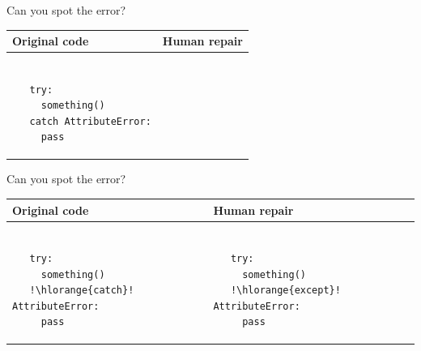 \documentclass{beamer}
\begin{document}
\begin{frame}[fragile]{Can you spot the error?}
  \begin{center}
    \begin{tabular}{|m{5.5cm}|m{5.5cm}|}
      \hline \rule{0pt}{2.5ex}\textbf{Original code}\rule[-1ex]{0pt}{2ex} &  \rule{0pt}{2.5ex}\textbf{Human repair}\rule[-1ex]{0pt}{2ex} \\\hline
      \begin{lstlisting}[escapechar=!, basicstyle=\linespread{1.3}\ttfamily\footnotesize]

   try:
     something()
   catch AttributeError:
     pass

      \end{lstlisting} & \begin{lstlisting}[escapechar=!, basicstyle=\linespread{1.3}\ttfamily\footnotesize]

      \end{lstlisting} \\\hline
    \end{tabular}
  \end{center}
\end{frame}

\begin{frame}[fragile]{Can you spot the error?}
  \begin{center}
    \begin{tabular}{|m{5.5cm}|m{5.5cm}|}
      \hline \rule{0pt}{2.5ex}\textbf{Original code}\rule[-1ex]{0pt}{2ex} &  \rule{0pt}{2.5ex}\textbf{Human repair}\rule[-1ex]{0pt}{2ex} \\\hline
      \begin{lstlisting}[escapechar=!, basicstyle=\linespread{1.3}\ttfamily\footnotesize]

   try:
     something()
   !\hlorange{catch}! AttributeError:
     pass

      \end{lstlisting} & \begin{lstlisting}[escapechar=!, basicstyle=\linespread{1.3}\ttfamily\footnotesize]

   try:
     something()
   !\hlorange{except}! AttributeError:
     pass

      \end{lstlisting} \\\hline
    \end{tabular}
  \end{center}
\end{frame}
\end{document}
